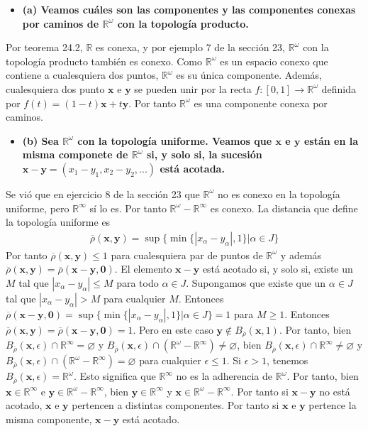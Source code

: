 \documentclass{article}
\newcommand{\vect}[1]{\boldsymbol{#1}}
\begin{document}
\begin{itemize}
\item \bf (a) \rm Veamos cuáles son las componentes y las componentes conexas por caminos de $\mathbb{R}^\omega$ con la topología producto.
\end{itemize}
Por teorema 24.2, $\mathbb{R}$ es conexa, y por ejemplo 7 de la sección 23,  $\mathbb{R}^\omega$ con la topología producto también es conexo. Como $\mathbb{R}^\omega$ es un espacio conexo que contiene a cualesquiera dos puntos, $\mathbb{R}^\omega$ es su única componente. Además, cualesquiera dos punto $\vect{x}$ e $\vect{y}$ se pueden unir por la recta $f:[0,1]\rightarrow \mathbb{R}^\omega$ definida por $f(t)=(1-t)\vect{x}+ t\vect{y}$. Por tanto $\mathbb{R}^\omega$ es una componente conexa por caminos. 
\begin{itemize}
\item \bf (b) \rm Sea $\mathbb{R}^\omega$ con la topología uniforme. Veamos que $\vect{x}$ e $\vect{y}$ están en la misma componete de $\mathbb{R}^\omega$ si, y solo si, la sucesión $\vect{x}-\vect{y}=(x_1-y_1,x_2-y_2,...)$ está acotada.
\end{itemize}
Se vió que en ejercicio 8 de la sección 23 que $\mathbb{R}^\omega$ no es conexo en la topología uniforme, pero $\mathbb{R}^\infty$ sí lo es. Por tanto $\mathbb{R}^\omega-\mathbb{R}^\infty$ es conexo. La distancia que define la topología uniforme es
\begin{eqnarray}
\overline\rho(\vect{x},\vect{y})=\sup\{\min\{|x_\alpha -y_\alpha|,1\}| \alpha\in J\}\nonumber
\end{eqnarray}
Por tanto $\overline\rho(\vect{x},\vect{y})\leq 1$ para cualesquiera par de puntos de $\mathbb{R}^\omega$ y además $\overline\rho(\vect{x},\vect{y})=\overline\rho(\vect{x}-\vect{y},\vect{0})$. El elemento $\vect{x}-\vect{y}$ está acotado si, y solo si, existe un $M$ tal que $|x_\alpha-y_\alpha|\leq M$ para todo $\alpha\in J$. Supongamos que existe que un $\alpha\in J$ tal que $|x_\alpha-y_\alpha|>M$ para cualquier $M$. Entonces $\overline\rho(\vect{x}-\vect{y},\vect{0})=\sup\{\min\{|x_\alpha -y_\alpha|,1\}| \alpha\in J\}= 1$ para  $M\geq 1$. Entonces $\overline\rho(\vect{x},\vect{y})=\overline\rho(\vect{x}-\vect{y},\vect{0})=1$. Pero en este caso $\vect{y}\notin B_{\overline\rho}(\vect{x},1)$. Por tanto, bien $B_{\overline\rho}(\vect{x},\epsilon)\cap \mathbb{R}^\infty=\varnothing$ y $B_{\overline\rho}(\vect{x},\epsilon)\cap( \mathbb{R}^\omega-\mathbb{R}^\infty)\neq\varnothing$, bien $B_{\overline\rho}(\vect{x},\epsilon)\cap \mathbb{R}^\infty\neq\varnothing$ y $B_{\overline\rho}(\vect{x},\epsilon)\cap (\mathbb{R}^\omega-\mathbb{R}^\infty)=\varnothing$ para cualquier $\epsilon\leq 1$. Si $\epsilon>1$, tenemos $B_{\overline\rho}(\vect{x},\epsilon)=\mathbb{R}^\omega$. Esto significa que $\mathbb{R}^\infty$ no es la adherencia de $\mathbb{R}^\omega$. Por tanto, bien $\vect{x}\in \mathbb{R}^\infty$ e $\vect{y}\in \mathbb{R}^\omega-\mathbb{R}^\infty$, bien $\vect{y}\in \mathbb{R}^\infty$ y $\vect{x}\in \mathbb{R}^\omega-\mathbb{R}^\infty$. Por tanto si $\vect{x}-\vect{y}$ no está acotado, $\vect{x}$ e $\vect{y}$ pertencen a distintas componentes. Por tanto si $\vect{x}$ e $\vect{y}$ pertence la misma componente, $\vect{x}-\vect{y}$ está acotado.
\end{document}

